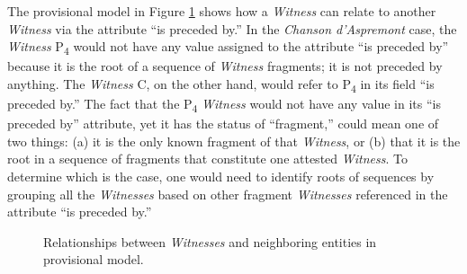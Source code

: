 The provisional model in Figure \ref{fig:WitnessRelations} shows how a \textit{Witness} can relate to another \textit{Witness} via the attribute ``is preceded by.'' In the \textit{Chanson d'Aspremont} case, the \textit{Witness} P\textsubscript{4} would not have any value assigned to the attribute ``is preceded by'' because it is the root of a sequence of \textit{Witness} fragments; it is not preceded by anything. The \textit{Witness} C, on the other hand, would refer to P\textsubscript{4} in its field ``is preceded by.'' The fact that the P\textsubscript{4} \textit{Witness} would not have any value in its ``is preceded by'' attribute, yet it has the status of ``fragment,'' could mean one of two things: (a) it is the only known fragment of that \textit{Witness}, or (b) that it is the root in a sequence of fragments that constitute one attested \textit{Witness}. To determine which is the case, one would need to identify roots of sequences by grouping all the \textit{Witnesses} based on other fragment \textit{Witnesses} referenced in the attribute ``is preceded by.''

\begin{figure}[ht]
    \begin{center}
        
    \end{center}
    \caption{Relationships between \textit{Witnesses} and neighboring entities in provisional model.}
    \label{fig:WitnessRelations}
\end{figure}

